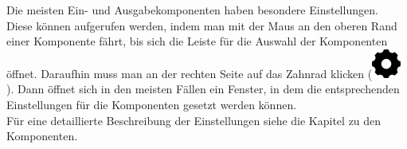 Die meisten Ein- und Ausgabekomponenten haben besondere Einstellungen. Diese können aufgerufen werden, indem man mit der Maus an den oberen
Rand einer Komponente fährt, bis sich die Leiste für die Auswahl der Komponenten
öffnet.  Daraufhin muss man an der rechten Seite auf das Zahnrad klicken
(\includegraphics[scale=0.22]{Images/SettingsIcon}). Dann öffnet sich in
den meisten Fällen ein Fenster, in dem die entsprechenden Einstellungen für die
Komponenten gesetzt werden können. \\
Für eine detaillierte Beschreibung der
Einstellungen siehe die Kapitel zu den Komponenten.
